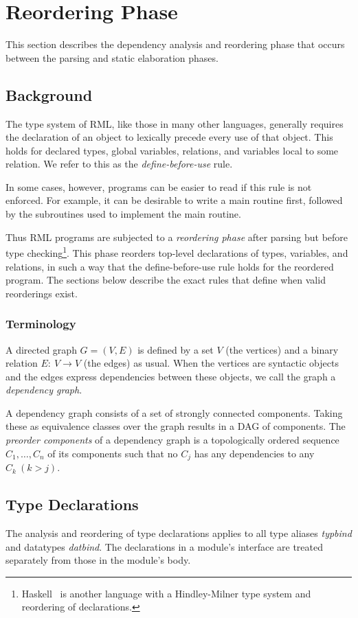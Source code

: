 %
\section{Reordering Phase}
This section describes the dependency analysis and reordering
phase that occurs between the parsing and static elaboration phases.

\subsection{Background}
The type system of RML, like those in many other languages,
generally requires the declaration of an object to lexically
precede every use of that object. This holds for declared types,
global variables, relations, and variables local to some relation.
We refer to this as the \emph{define-before-use} rule.

In some cases, however, programs can be easier to read
if this rule is not enforced.
For example, it can be desirable to write a main routine first,
followed by the subroutines used to implement the main routine.

Thus RML programs are subjected to a \emph{reordering phase} after
parsing but before type checking\footnote{
Haskell~\cite[Section 4.5.1]{Haskell96} is another language with
a Hindley-Milner type system and reordering of declarations.}.
This phase reorders top-level declarations of types, variables,
and relations, in such a way that the define-before-use rule holds
for the reordered program.
The sections below describe the exact rules that define when valid
reorderings exist.

\subsubsection{Terminology}
A directed graph $G = (V,E)$ is defined by a set $V$ (the vertices)
and a binary relation $E:~V\rightarrow V$ (the edges) as usual.
When the vertices are syntactic objects and the edges express
dependencies between these objects, we call the graph a \emph{dependency graph}.

A dependency graph consists of a set of strongly connected components.
Taking these as equivalence classes over the graph results in a DAG of components.
The \emph{preorder components} of a dependency graph is a topologically
ordered sequence $C_1,\ldots,C_n$ of its components such that no $C_j$
has any dependencies to any $C_k~(k>j)$.

\subsection{Type Declarations}
The analysis and reordering of type declarations applies to
all type aliases \emph{typbind} and datatypes \emph{datbind}.
The declarations in a module's interface are treated separately
from those in the module's body.

